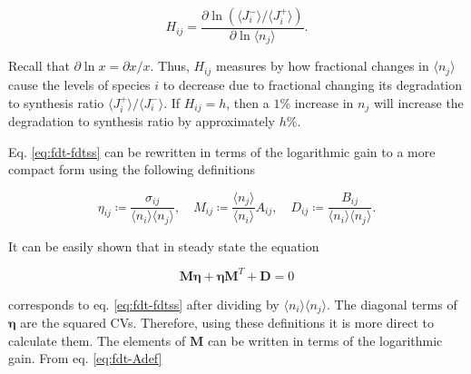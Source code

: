 \begin{equation}
  \label{eq:fdt-def_H}
  H_{ij} = \frac{\partial \ln (\langle J_i^-\rangle/\langle J_i^+\rangle)}{\partial \ln \langle n_j\rangle}.
\end{equation}

Recall that $\partial \ln x = \partial x/x$. Thus, $H_{ij}$ measures by how fractional changes in $\langle n_j\rangle$ cause the levels of species $i$ to decrease due to fractional changing its degradation to synthesis ratio $\langle J_i^+\rangle/\langle J_i^-\rangle$. If $H_{ij} = h$, then a $1\%$ increase in $n_j$ will increase the degradation to synthesis ratio by approximately $h\%$.


Eq. \eqref{eq:fdt-fdtss} can be rewritten in terms of the logarithmic gain to a more compact form using the following definitions

\begin{equation*}
  \eta_{ij}\coloneqq\frac{\sigma_{ij}}{\langle n_i\rangle\langle n_j\rangle}, \quad M_{ij}\coloneqq\frac{\langle n_j\rangle}{\langle n_i\rangle}A_{ij}, \quad D_{ij}\coloneqq\frac{B_{ij}}{\langle n_i\rangle\langle n_j\rangle}.
\end{equation*}

It can be easily shown that in steady state the equation

\begin{equation}
  \label{eq:fdt-fdtss2}
  \mathbf{M\eta}+\mathbf{\eta M}^T+\mathbf{D}=0
\end{equation}

corresponds to eq. \eqref{eq:fdt-fdtss} after dividing by $\langle n_i\rangle\langle n_j\rangle$. The diagonal terms of $\mathbf{\eta}$ are the squared CVs. Therefore, using these definitions it is more direct to calculate them. The elements of $\mathbf{M}$ can be written in terms of the logarithmic gain. From eq. \eqref{eq:fdt-Adef}

